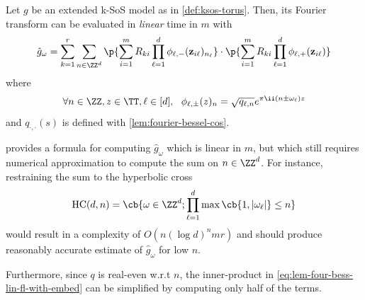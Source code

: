 \documentclass{article}
\begin{document}
\begin{lemma}\label{lem:fourier-coeff-bessel-torus-linear}
  Let $g$ be an extended k-SoS model as in \cref{def:ksos-torus}. Then, its Fourier transform can be evaluated in \emph{linear} time in $m$ with
  \begin{equation}
    \hat{g}_\omega
    = \sum_{k = 1}^r \sum_{n \in \ZZ^d} \p{\sum_{i = 1}^m R_{ki} \prod_{\ell = 1}^d \phi_{\ell, -} (\mathbf{z}_{i \ell})_{n_\ell}} \cdot \p{\sum_{i = 1}^m R_{ki} \prod_{\ell = 1}^d \phi_{\ell, +} (\mathbf{z}_{i \ell})}
  \end{equation}
  where
  \begin{equation*}
    \forall n \in \ZZ, z \in \TT, \ell \in [d], ~~ \phi_{\ell, \pm} (z)_n = \sqrt{q_{\ell, n}} e^{\pi \ii (n \pm \omega_\ell) z}
  \end{equation*}
  and $q_{\cdot, \cdot}(s)$ is defined with \cref{lem:fourier-bessel-cos}.
\end{lemma}

 provides a formula for computing $\hat{g}_\omega$ which is linear in $m$, but which still requires numerical approximation to compute the sum on $n \in \ZZ^d$. For instance, restraining the sum to the hyperbolic cross \cite{dungHyperbolicCrossApproximation2017}
\begin{equation*}
  \mathrm{HC}(d, n) = \cb{\omega \in \ZZ^d; \prod_{\ell = 1}^d \max \cb{1, |\omega_\ell|} \leq n}
\end{equation*}
would result in a complexity of $O(n (\log d)^{n} m r)$ and should produce reasonably accurate estimate of $\hat{g}_\omega$ for low $n$.

Furthermore, since $q$ is real-even w.r.t $n$, the inner-product in \cref{eq:lem-four-bess-lin-fl-with-embed} can be simplified by computing only half of the terms.
\end{document}
